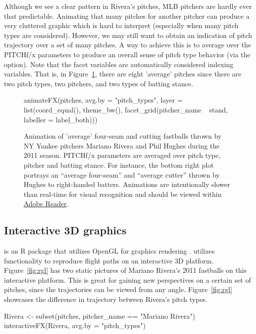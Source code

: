 \begin{article}
Although we see a clear pattern in Rivera's pitches, MLB pitchers
are hardly ever that predictable. Animating that many pitches for
another pitcher can produce a very cluttered graphic which is hard
to interpret (especially when many pitch types are considered). However,
we may still want to obtain an indication of pitch trajectory over
a set of many pitches. A way to achieve this is to average over the
PITCHf/x parameters to produce an overall sense of pitch type behavior
(via the  option). Note that the facet variables are
automatically considered indexing variables. That is, in Figure~\ref{fig:animate2},
there are eight 'average' pitches since there are two pitch types,
two pitchers, and two types of batting stance. 
\begin{figure}[h!]
\begin{Schunk}
\begin{Sinput}
animateFX(pitches, avg.by = "pitch_types", layer = list(coord_equal(), theme_bw(),
  facet_grid(pitcher_name ~ stand, labeller = label_both)))
\end{Sinput}

\end{Schunk}

\caption{\label{fig:animate2}Animation of 'average' four-seam and cutting
fastballs thrown by NY Yankee pitchers Mariano Rivera and Phil Hughes
during the 2011 season. PITCHf/x parameters are averaged over pitch
type, pitcher and batting stance. For instance, the bottom right plot
portrays an ``average four-seam'' and ``average cutter'' thrown
by Hughes to right-handed batters. Animations are intentionally slower
than real-time for visual recognition and should be viewed within
\protect\href{http://get.adobe.com/reader/}{Adobe Reader}.}
\end{figure}

\subsection{Interactive 3D graphics}

 is an R package that utilizes OpenGL for graphics rendering
\citep{rgl}.  utilizes  functionality
to reproduce flight paths on an interactive 3D platform. Figure~\ref{fig:rgl}
has two static pictures of Mariano Rivera's 2011 fastballs on this
interactive platform. This is great for gaining new perspectives on
a certain set of pitches, since the trajectories can be viewed from
any angle. Figure~\ref{fig:rgl} showcases the difference in trajectory
between Rivera's pitch types.
%
\begin{Schunk}
\begin{Sinput}
Rivera <- subset(pitches, pitcher_name == "Mariano Rivera")
interactiveFX(Rivera, avg.by = "pitch_types")
\end{Sinput}
\end{Schunk}


\end{article}

